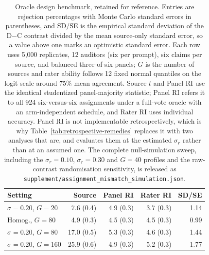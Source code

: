 \begin{table}[t]
\centering\footnotesize
\setlength{\tabcolsep}{1.2pt}
\begin{tabular}{@{}lrrrr@{}}
\toprule
Setting & Source & Panel RI & Rater RI & SD/SE \\
\midrule
$\sigma=0.20$, $G=20$ & 7.6 (0.4) & 4.9 (0.3) & 3.7 (0.3) & 1.14 \\
Homog., $G=80$ & 4.9 (0.3) & 4.5 (0.3) & 4.5 (0.3) & 0.99 \\
$\sigma=0.20$, $G=80$ & 17.0 (0.5) & 5.3 (0.3) & 4.6 (0.3) & 1.44 \\
$\sigma=0.20$, $G=160$ & 25.9 (0.6) & 4.9 (0.3) & 5.2 (0.3) & 1.77 \\
\bottomrule
\end{tabular}
\caption{Oracle design benchmark, retained for reference. Entries are rejection percentages with Monte Carlo standard errors in parentheses, and SD/SE is the empirical standard deviation of the D$-$C contrast divided by the mean source-only standard error, so a value above one marks an optimistic standard error. Each row uses 5,000 replicates, 12 auditors (six per prompt), six claims per source, and balanced three-of-six panels; $G$ is the number of sources and rater ability follows 12 fixed normal quantiles on the logit scale around 75\% mean agreement. Source $t$ and Panel RI use the identical studentized panel-majority statistic; Panel RI refers it to all 924 six-versus-six assignments under a full-vote oracle with an arm-independent schedule, and Rater RI uses individual accuracy. Panel RI is not implementable retrospectively, which is why Table~\ref{tab:retrospective-remedies} replaces it with two analyses that are, and evaluates them at the estimated $\sigma_r$ rather than at an assumed one. The complete null-simulation sweep, including the $\sigma_r=0.10$, $\sigma_r=0.30$ and $G=40$ profiles and the raw-contrast randomisation sensitivity, is released as \texttt{supplement/assignment\_mismatch\_simulation.json}.}
\label{tab:assignment-mismatch-simulation}
\end{table}
